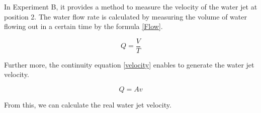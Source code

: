 In Experiment B, it provides a method to measure the velocity of the water jet at position 2. 
The water flow rate is calculated by measuring the volume of water flowing out in a certain time 
by the formula \eqref{Flow}.

\begin{equation}
\label{Flow}
Q=\frac{V}{T}
\end{equation}

Further more, the continuity equation \eqref{velocity} enables to generate the water jet velocity.

\begin{equation}
\label{velocity}
Q=Av
\end{equation}

From this, we can calculate the real water jet velocity.